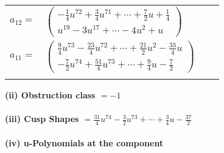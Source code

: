 \documentclass[1p]{elsarticle_modified}
\theoremstyle{definition}
\begin{document}
\begin{tabular}{m{7pt} m{180pt} m{7pt} m{180pt} }
\flushright $a_{12}=$&$\begin{pmatrix}-\frac{1}{4} u^{72}+\frac{3}{4} u^{71}+\cdots+\frac{7}{2} u+\frac{1}{4}\\u^{19}-3 u^{17}+\cdots-4 u^2+u\end{pmatrix}$ \\
\flushright $a_{11}=$&$\begin{pmatrix}\frac{9}{4} u^{73}-\frac{23}{4} u^{72}+\cdots+\frac{21}{2} u^2-\frac{35}{4} u\\-\frac{7}{2} u^{74}+\frac{51}{4} u^{73}+\cdots+\frac{9}{4} u-\frac{7}{2}\end{pmatrix}$\\&\end{tabular}
\flushleft \textbf{(ii) Obstruction class $= -1$}\\~\\
\flushleft \textbf{(iii) Cusp Shapes $= \frac{31}{4} u^{74}-\frac{3}{2} u^{73}+\cdots+\frac{3}{4} u-\frac{37}{2}$}\\~\\
\newpage\renewcommand{\arraystretch}{1}
\flushleft \textbf{(iv) u-Polynomials at the component}\newline \\
\end{document}
